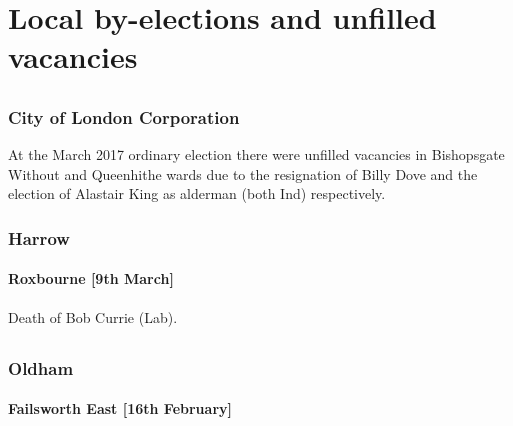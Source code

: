\documentclass[a4paper,openany]{book}
\begin{document}
\chapter{Local by-elections and unfilled vacancies}

\begin{resultsiii}

\section[North London]{}

\subsection*{City of London Corporation}

At the March 2017 ordinary election there were unfilled vacancies in Bishopsgate Without and Queenhithe wards due to the resignation of Billy Dove and the election of Alastair King as alderman (both Ind) respectively.

\subsection*{Harrow}

\subsubsection*{Roxbourne \hspace*{\fill}\nolinebreak[1]%
\enspace\hspace*{\fill}
[9th March]}


Death of Bob Currie (Lab).

\section[Greater Manchester]{}

\subsection*{Oldham}

\subsubsection*{Failsworth East \hspace*{\fill}\nolinebreak[1]%
\enspace\hspace*{\fill}
[16th February]}


\end{resultsiii}
\end{document}
